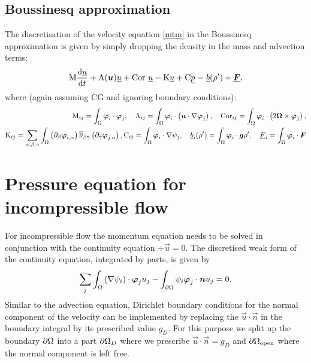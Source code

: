 \subsection{Boussinesq approximation}

The discretisation of the velocity equation \eqref{mtm}
in the Boussinesq approximation is given by simply
dropping the density in the mass and advection terms:
\begin{equation*}
  \mathrm{M} \frac{\mathrm{d}\underline{u}}{\mathrm{d} t}
    +\mathrm{A}({\mbox{\boldmath$u$}})\underline{u}
    +\mathrm{Cor}~\underline{u}
    -\mathrm{K}\underline{u}
    +\mathrm{C} \underline{p}
    =\underline{b}(\rho')+\underline{{\mbox{\boldmath$F$}}},
\end{equation*}
where (again assuming CG and ignoring boundary conditions):
\begin{equation*}
\begin{split}
  \mathrm{M}_{ij}=\int_\Omega {\mbox{\boldmath$\varphi$}}_i\cdot{\mbox{\boldmath$\varphi$}}_j, \quad
  \mathrm{A}_{ij}=\int_\Omega {\mbox{\boldmath$\varphi$}}_i\cdot\left({\mbox{\boldmath$u$}}\cdot\nabla {\mbox{\boldmath$\varphi$}}_j\right), \quad
  \mathrm{Cor}_{ij}=
    \int_\Omega {\mbox{\boldmath$\varphi$}}_i\cdot\left(2{\mbox{\boldmath$\Omega$}}\times{\mbox{\boldmath$\varphi$}}_j\right), \\
  \mathrm{K}_{ij}=\sum_{\alpha,\beta,\gamma} \int_\Omega
    \left(\partial_\beta{\mbox{\boldmath$\varphi$}}_{i,\alpha}\right) \overline{\overline{\nu}}_{\beta\gamma}
      \left(\partial_\gamma {\mbox{\boldmath$\varphi$}}_{j,\alpha}\right),
  \mathrm{C}_{ij}=\int_\Omega {\mbox{\boldmath$\varphi$}}_i\cdot\nabla\psi_j, \quad
    \underline{b}_i(\rho')=\int_\Omega {\mbox{\boldmath$\varphi$}}_i\cdot{\mbox{\boldmath$g$}}\rho',\quad
    \underline{F}_i=\int_\Omega {\mbox{\boldmath$\varphi$}}_i \cdot{\mbox{\boldmath$F$}}
\end{split}
\end{equation*}

\section{Pressure equation for incompressible flow}
\label{Sect:ND_pressure_equation}

For incompressible flow the momentum equation needs to be solved
in conjunction with the continuity equation
$\div\vec u=0$. The discretised weak form of
the continuity equation, integrated by parts, is given by
\begin{equation*}
  \sum_j \int_\Omega \left(\nabla\psi_i\right)\cdot{\mbox{\boldmath$\varphi$}}_j u_j -
    \int_{\partial\Omega} \psi_i{\mbox{\boldmath$\varphi$}}_j\cdot{\mbox{\boldmath$n$}} u_j = 0.
\end{equation*}
Similar to the advection equation, Dirichlet boundary conditions for the
normal component of the velocity can be implemented by replacing
the $\vec u\cdot\vec n$ in the boundary integral by its prescribed
value $g_D$. For this purpose we split up the
boundary ${\partial\Omega}$ into a part
${\partial\Omega}_D$ where we prescribe $\vec u\cdot\vec n=g_D$ and
${\partial\Omega}_{\mathrm{open}}$ where the normal component is left free.

